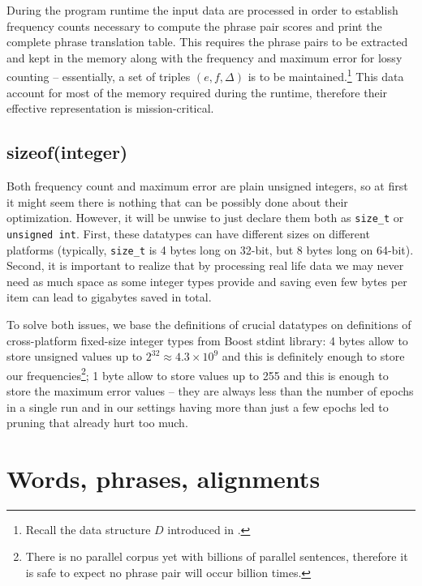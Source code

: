 During the program runtime the input data are processed in order to establish frequency counts
necessary to compute the phrase pair scores and print the complete phrase translation table.
This requires the phrase pairs to be extracted and kept in the memory along with the frequency
and maximum error for lossy counting -- essentially, a set of triples $(e, f, \Delta)$ is
to be maintained.\footnote{Recall the data structure $D$ introduced in .}
This data account for most of the memory required during the runtime, therefore their effective
representation is mission-critical.

\subsection{sizeof(integer)}

Both frequency count and maximum error are plain unsigned integers, so at first it might seem
there is nothing that can be possibly done about their optimization.
However, it will be unwise to just declare them both as \verb|size_t| or \verb|unsigned int|.
First, these datatypes can have different sizes on different platforms (typically, \verb|size_t| is
4 bytes long on 32-bit, but 8 bytes long on 64-bit).
Second, it is important to realize that by processing real life data we may never need as much
space as some integer types provide and saving even few bytes per item can lead to gigabytes saved
in total.

To solve both issues, we base the definitions of crucial datatypes on definitions of cross-platform
fixed-size integer types from Boost stdint library: 4 bytes allow to store unsigned values up to
$2^{32} \approx 4.3 \times 10^9$ and this is definitely enough to store our frequencies\footnote{There
is no parallel corpus yet with billions of parallel sentences, therefore it is safe to expect no phrase
pair will occur billion times.}; 1 byte allow to store values up to 255 and this is enough to store
the maximum error values -- they are always less than the number of epochs in a single run and in our
settings having more than just a few epochs led to pruning that already hurt too much.




\section{Words, phrases, alignments}

